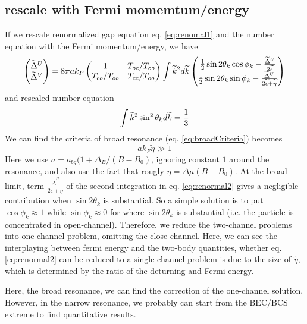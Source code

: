 \subsection{rescale with Fermi momemtum/energy}
If we rescale renormalized gap equation eq. \ref{eq:renomal1} and the number equation with the Fermi momentum/energy, we have 
\begin{equation}\label{eq:renormal2}
\begin{pmatrix}\widetilde\Delta^U\\\widetilde\Delta^V\end{pmatrix}=
8\pi{a}{k_F}\begin{pmatrix}1&T_{oc}/T_{oo}\\T_{co}/T_{oo}&T_{cc}/T_{oo}\end{pmatrix}
\int\widetilde{k}^2d\widetilde{k}
\begin{pmatrix}
\frac{1}{2}\sin2\theta_{k}\cos\phi_k-\frac{\widetilde\Delta^U}{2\widetilde\epsilon}\\
\frac{1}{2}\sin2\theta_{k}\sin\phi_k-\frac{\widetilde\Delta^U}{2\widetilde\epsilon+\widetilde{\eta}}
\end{pmatrix}
\end{equation}
and rescaled number equation
\begin{equation}
 \int\widetilde{k}^2\sin^2\theta_kd\widetilde{k}=\frac{1}{3}
\end{equation}
We can find the criteria of broad resonance (eq. \ref{eq:broadCriteria}) becomes 
\begin{equation}
 ak_F\widetilde{\eta}\gg1 
\end{equation}
Here we use $a=a_{bg}(1+\Delta_B/(B-B_0)$,  ignoring constant $1$ around the resonance, and also use the fact that rougly $\eta=\Delta\mu(B-B_0)$. At the broad limit, term $\frac{\widetilde\Delta^U}{2\widetilde\epsilon+\widetilde{\eta}}$ of the second integration in eq. \ref{eq:renormal2} gives a negligible contribution when $\sin2\theta_k$ is substantial.  So a simple solution is to put $\cos\phi_k\approx1$ while $\sin\phi_k\approx0$ for where $\sin2\theta_k$ is substantial (i.e. the particle is concentrated in open-channel).  Therefore, we reduce the two-channel problems into one-channel problem, omitting the close-channel. Here, we can see the interplaying between fermi energy and the two-body quantities, whether eq. \ref{eq:renormal2} can be reduced to a single-channel problem is due to the size of $\widetilde{\eta}$, which is determined by the ratio of the deturning and Fermi energy.  

Here, the broad resonance, we can find the correction of the one-channel solution.  However, in the narrow resonance, we probably can start from the BEC/BCS extreme to find quantitative results. 